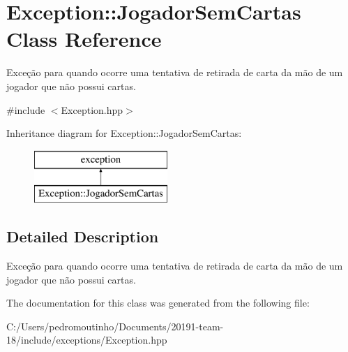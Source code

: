 \hypertarget{class_exception_1_1_jogador_sem_cartas}{}\section{Exception\+::Jogador\+Sem\+Cartas Class Reference}
\label{class_exception_1_1_jogador_sem_cartas}


Exceção para quando ocorre uma tentativa de retirada de carta da mão de um jogador que não possui cartas.  




{\ttfamily \#include $<$Exception.\+hpp$>$}

Inheritance diagram for Exception\+::Jogador\+Sem\+Cartas\+:\begin{figure}[H]
\begin{center}
\leavevmode
\includegraphics[height=2.000000cm]{class_exception_1_1_jogador_sem_cartas}
\end{center}
\end{figure}


\subsection{Detailed Description}
Exceção para quando ocorre uma tentativa de retirada de carta da mão de um jogador que não possui cartas. 



The documentation for this class was generated from the following file\+:\begin{DoxyCompactItemize}
\item 
C\+:/\+Users/pedromoutinho/\+Documents/20191-\/team-\/18/include/exceptions/Exception.\+hpp\end{DoxyCompactItemize}
